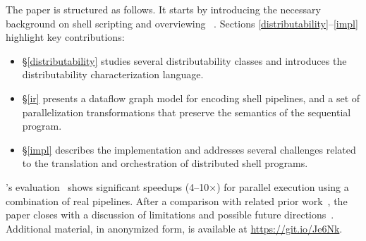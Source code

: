 \documentclass[acmsmall,10pt,review,anonymous]{acmart}
\begin{document}

The paper is structured as follows.
It starts by introducing the necessary background on shell scripting and overviewing \sys~.
Sections \ref{distributability}--\ref{impl} highlight key
contributions:
\begin{itemize}

  \item
  \S\ref{distributability} studies several distributability classes and introduces the distributability characterization language.

  \item
  \S\ref{ir} presents a dataflow graph model for encoding shell pipelines, and a set of parallelization transformations that preserve the semantics of the sequential program.

  \item
    \S\ref{impl} describes the \sys implementation and addresses several challenges related to the translation and orchestration of distributed shell programs.
\end{itemize}

\noindent
\sys's evaluation~ shows significant speedups (4--10$\times$) for parallel execution using a combination of real pipelines. %
After a comparison with related prior work~, the paper closes with a discussion of limitations and possible future directions~.
Additional material, in anonymized form, is available at
\href{https://git.io/Je6Nk}{https://git.io/Je6Nk}.

% 
\end{document}
